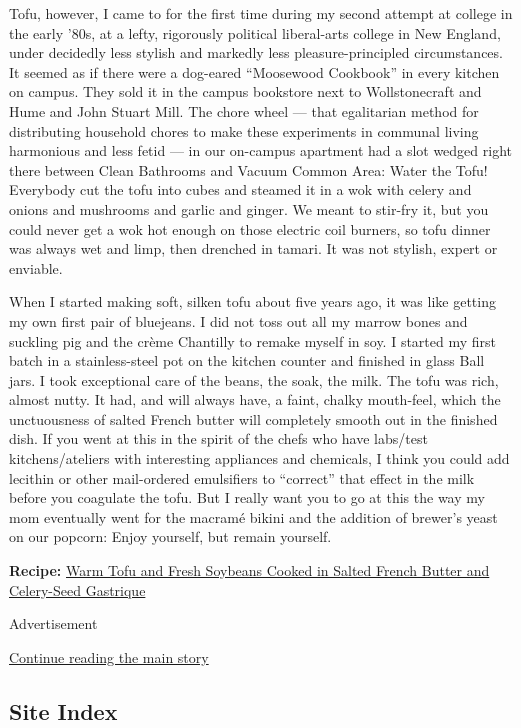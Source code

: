 Tofu, however, I came to for the first time during my second attempt at
college in the early '80s, at a lefty, rigorously political liberal-arts
college in New England, under decidedly less stylish and markedly less
pleasure-principled circumstances. It seemed as if there were a
dog-eared ``Moosewood Cookbook'' in every kitchen on campus. They sold
it in the campus bookstore next to Wollstonecraft and Hume and John
Stuart Mill. The chore wheel --- that egalitarian method for
distributing household chores to make these experiments in communal
living harmonious and less fetid --- in our on-campus apartment had a
slot wedged right there between Clean Bathrooms and Vacuum Common Area:
Water the Tofu! Everybody cut the tofu into cubes and steamed it in a
wok with celery and onions and mushrooms and garlic and ginger. We meant
to stir-fry it, but you could never get a wok hot enough on those
electric coil burners, so tofu dinner was always wet and limp, then
drenched in tamari. It was not stylish, expert or enviable.

When I started making soft, silken tofu about five years ago, it was
like getting my own first pair of bluejeans. I did not toss out all my
marrow bones and suckling pig and the crème Chantilly to remake myself
in soy. I started my first batch in a stainless-steel pot on the kitchen
counter and finished in glass Ball jars. I took exceptional care of the
beans, the soak, the milk. The tofu was rich, almost nutty. It had, and
will always have, a faint, chalky mouth-feel, which the unctuousness of
salted French butter will completely smooth out in the finished dish. If
you went at this in the spirit of the chefs who have labs/test
kitchens/ateliers with interesting appliances and chemicals, I think you
could add lecithin or other mail-ordered emulsifiers to ``correct'' that
effect in the milk before you coagulate the tofu. But I really want you
to go at this the way my mom eventually went for the macramé bikini and
the addition of brewer's yeast on our popcorn: Enjoy yourself, but
remain yourself.

\textbf{Recipe:}
\href{https://cooking.nytimes3xbfgragh.onion/recipes/1018892-warm-tofu-and-fresh-soybeans-cooked-in-salted-french-butter-and-celery-seed-gastrique}{Warm
Tofu and Fresh Soybeans Cooked in Salted French Butter and Celery-Seed
Gastrique}

Advertisement

\protect\hyperlink{after-bottom}{Continue reading the main story}

\hypertarget{site-index}{%
\subsection{Site Index}\label{site-index}}

